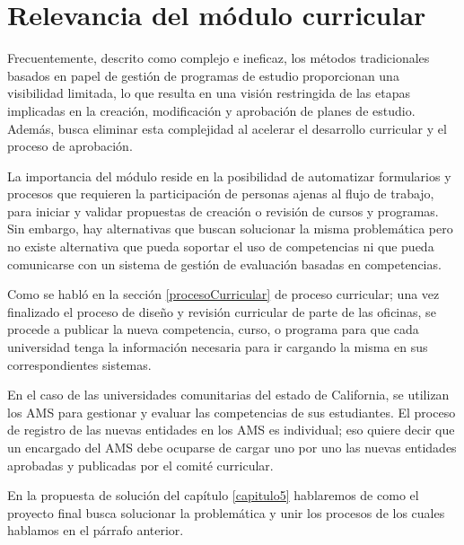 \section{Relevancia del módulo curricular}
Frecuentemente, descrito como complejo e ineficaz, los métodos tradicionales basados en papel de gestión de programas de estudio proporcionan una visibilidad limitada, lo que resulta en una visión restringida de las etapas implicadas en la creación, modificación y aprobación de planes de estudio. Además, busca eliminar esta complejidad al acelerar el desarrollo curricular y el proceso de aprobación.

La importancia del módulo reside en la posibilidad de automatizar formularios y procesos que requieren la participación de personas ajenas al flujo de trabajo, para iniciar y validar propuestas de creación o revisión de cursos y programas. Sin embargo, hay alternativas que buscan solucionar la misma problemática pero no existe alternativa que pueda soportar el uso de competencias ni que pueda comunicarse con un sistema de gestión de evaluación basadas en competencias.

Como se habló en la sección \ref{procesoCurricular} de proceso curricular; una vez finalizado el proceso de diseño y revisión curricular de parte de las oficinas, se procede a publicar la nueva competencia, curso, o programa para que cada universidad tenga la información necesaria para ir cargando la misma en sus correspondientes sistemas. 

En el caso de las universidades comunitarias del estado de California, se utilizan los AMS para gestionar y evaluar las competencias de sus estudiantes. El proceso de registro de las nuevas entidades en los AMS es individual; eso quiere decir que un encargado del AMS debe ocuparse de cargar uno por uno las nuevas entidades aprobadas y publicadas por el comité curricular.

En la propuesta de solución del capítulo \ref{capitulo5} hablaremos de como el proyecto final busca solucionar la problemática y unir los procesos de los cuales hablamos en el párrafo anterior.